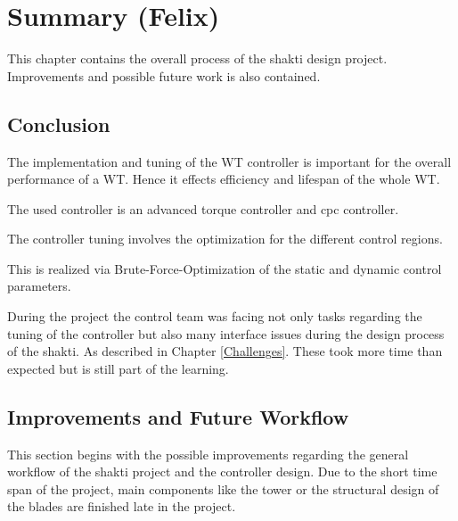 \chapter{Summary (Felix)}
This chapter contains the overall process of the \gls{shakti} design project.
Improvements and possible future work is also contained.
\section{Conclusion}
The implementation and tuning of the \gls{WT} controller is important for the overall performance of a \gls{WT}. 
Hence it effects efficiency and lifespan of the whole \gls{WT}.

The used controller is an advanced torque controller and \gls{cpc} controller. 

The controller tuning involves the optimization for the different control regions. 

This is realized via Brute-Force-Optimization of the static and dynamic control parameters.   





During the project the control team was facing not only tasks regarding the tuning of the controller but also many interface issues during the design process of the \gls{shakti}.
As described in Chapter \ref{Challenges}. 
These took more time than expected but is still part of the learning.

    

\section{Improvements and Future Workflow}
This section begins with the possible improvements regarding the general workflow of the \gls{shakti} project and the controller design.
Due to the short time span of the project, main components like the tower or the structural design of the blades are finished late in the project. 
   